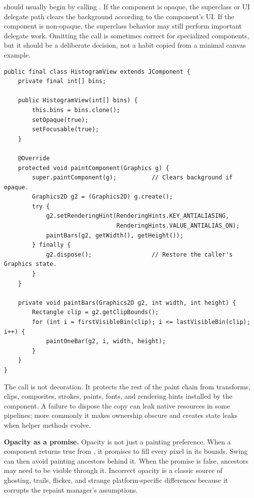  should usually begin by calling . If the component is opaque, the superclass or UI delegate path clears the background according to the component's UI. If the component is non-opaque, the superclass behavior may still perform important delegate work. Omitting the call is sometimes correct for specialized components, but it should be a deliberate decision, not a habit copied from a minimal canvas example.

\begin{lstlisting}[caption={A conventional custom component painting skeleton.}]
public final class HistogramView extends JComponent {
    private final int[] bins;

    public HistogramView(int[] bins) {
        this.bins = bins.clone();
        setOpaque(true);
        setFocusable(true);
    }

    @Override
    protected void paintComponent(Graphics g) {
        super.paintComponent(g);          // Clears background if opaque.
        Graphics2D g2 = (Graphics2D) g.create();
        try {
            g2.setRenderingHint(RenderingHints.KEY_ANTIALIASING,
                                RenderingHints.VALUE_ANTIALIAS_ON);
            paintBars(g2, getWidth(), getHeight());
        } finally {
            g2.dispose();                 // Restore the caller's Graphics state.
        }
    }

    private void paintBars(Graphics2D g2, int width, int height) {
        Rectangle clip = g2.getClipBounds();
        for (int i = firstVisibleBin(clip); i <= lastVisibleBin(clip); i++) {
            paintOneBar(g2, i, width, height);
        }
    }
}
\end{lstlisting}

The  call is not decoration. It protects the rest of the paint chain from transforms, clips, composites, strokes, paints, fonts, and rendering hints installed by the component. A failure to dispose the copy can leak native resources in some pipelines; more commonly it makes ownership obscure and creates state leaks when helper methods evolve.

\textbf{Opacity as a promise.} Opacity is not just a painting preference. When a component returns true from , it promises to fill every pixel in its bounds. Swing can then avoid painting ancestors behind it. When the promise is false, ancestors may need to be visible through it. Incorrect opacity is a classic source of ghosting, trails, flicker, and strange platform-specific differences because it corrupts the repaint manager's assumptions.

